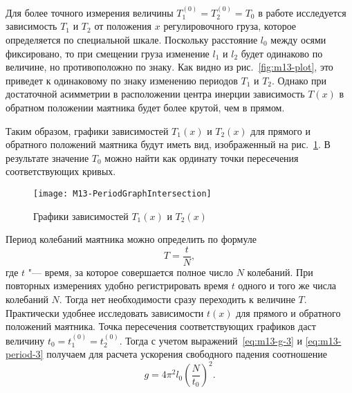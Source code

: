 \documentclass[a4paper, 12pt]{extarticle}
\begin{document}
Для более точного измерения величины $T_1^{(0)} = T_2^{(0)} = T_0$ в работе исследуется зависимость $T_1$ и $T_2$ от положения $x$ регулировочного груза, которое определяется по специальной шкале. Поскольку расстояние $l_0$ между осями фиксировано, то при смещении груза изменение $l_1$ и $l_2$ будет одинаково по величине, но противоположно по знаку. Как видно из рис.~\ref{fig:m13-plot}, это приведет к одинаковому по знаку изменению периодов $T_1$ и $T_2$. Однако при достаточной асимметрии в расположении центра инерции зависимость $T(x)$ в обратном положении маятника будет более крутой, чем в прямом. %

Таким образом, графики зависимостей $T_1(x)$ и $T_2(x)$ для прямого и обратного положений маятника будут иметь вид, изображенный на рис.~\ref{fig:m13-plot-2}. В результате значение $T_0$ можно найти как ординату точки пересечения соответствующих кривых. %

\begin{figure}[h]
\begin{center}
\texttt{[image: M13-PeriodGraphIntersection]}
\end{center}
\caption{Графики зависимостей $T_1(x)$ и $T_2(x)$ \label{fig:m13-plot-2}}
\end{figure}

Период колебаний маятника можно определить по формуле
\begin{equation}
\label{eq:m13-period-3}
T = \frac{t}{N},
\end{equation}
где $t$ "--- время, за которое совершается полное число $N$ колебаний.
При повторных измерениях удобно регистрировать время $t$ одного и того же числа колебаний $N$. Тогда нет необходимости сразу переходить к величине $T$.  Практически удобнее исследовать зависимости $t(x)$ для прямого и обратного положений маятника. Точка пересечения соответствующих графиков даст величину $ t_0 = t_1^{(0)} = t_2^{(0)}$. Тогда с учетом выражений~\eqref{eq:m13-g-3} и \eqref{eq:m13-period-3} получаем для расчета ускорения свободного падения соотношение %
\begin{equation}
\label{eq:m13-g-4}
g = 4 \pi^2 l_0 \left( \frac{N}{t_0}\right) ^2.
\end{equation}
\end{document}
